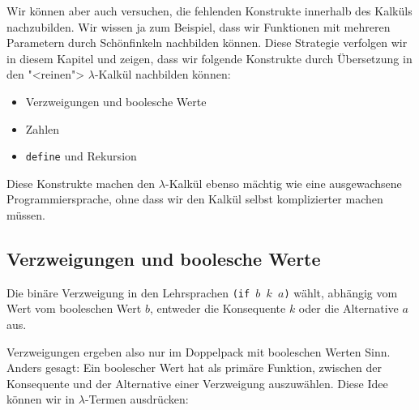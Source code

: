 Wir können aber auch versuchen, die fehlenden Konstrukte innerhalb des
Kalküls nachzubilden.  Wir wissen ja zum Beispiel, dass wir Funktionen
mit mehreren Parametern durch Schönfinkeln nachbilden können.  Diese
Strategie verfolgen wir in diesem Kapitel und zeigen, dass wir
folgende Konstrukte durch Übersetzung in den "<reinen">
$\lambda$-Kalkül nachbilden können:
%
\begin{itemize}
\item Verzweigungen und boolesche Werte
\item Zahlen
\item \lstinline{define} und Rekursion
\end{itemize}
%
Diese Konstrukte machen den $\lambda$-Kalkül ebenso mächtig wie eine
ausgewachsene Programmiersprache, ohne dass wir den Kalkül selbst
komplizierter machen müssen.

\subsection{Verzweigungen und boolesche Werte}
\label{sec:booleans}
%
Die binäre Verzweigung in den Lehrsprachen
\texttt{(if \(b\) \(k\) \(a\))} wählt, abhängig vom Wert vom
booleschen Wert $b$, entweder die Konsequente
$k$ oder die Alternative $a$ aus.

Verzweigungen ergeben also nur im Doppelpack mit booleschen Werten
Sinn.  Anders gesagt: Ein boolescher Wert hat als primäre Funktion,
zwischen der Konsequente und der Alternative einer Verzweigung
auszuwählen.  Diese Idee können wir in $\lambda$-Termen ausdrücken:

